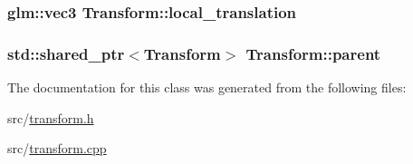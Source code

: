\subsubsection[{local\+\_\+translation}]{\setlength{\rightskip}{0pt plus 5cm}glm\+::vec3 Transform\+::local\+\_\+translation\hspace{0.3cm}{\ttfamily [private]}}\label{class_transform_a9cab8178cfc03757f96fb805d3725a2f}
\hypertarget{class_transform_a71f8820c3ef3bd92f681bc92d200548f}{}
\subsubsection[{parent}]{\setlength{\rightskip}{0pt plus 5cm}std\+::shared\+\_\+ptr$<${\bf Transform}$>$ Transform\+::parent\hspace{0.3cm}{\ttfamily [private]}}\label{class_transform_a71f8820c3ef3bd92f681bc92d200548f}


The documentation for this class was generated from the following files\+:\begin{DoxyCompactItemize}
\item 
src/\hyperlink{transform_8h}{transform.\+h}\item 
src/\hyperlink{transform_8cpp}{transform.\+cpp}\end{DoxyCompactItemize}
